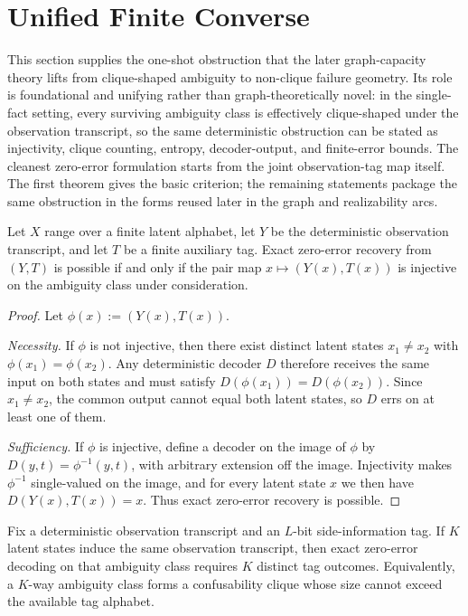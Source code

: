 \section{Unified Finite Converse}\label{sec:converse}


This section supplies the one-shot obstruction that the later graph-capacity theory lifts from clique-shaped ambiguity to non-clique failure geometry. Its role is foundational and unifying rather than graph-theoretically novel: in the single-fact setting, every surviving ambiguity class is effectively clique-shaped under the observation transcript, so the same deterministic obstruction can be stated as injectivity, clique counting, entropy, decoder-output, and finite-error bounds. The cleanest zero-error formulation starts from the joint observation-tag map itself. The first theorem gives the basic criterion; the remaining statements package the same obstruction in the forms reused later in the graph and realizability arcs.

\begin{theorem}\label{thm:pair-injective}
Let $X$ range over a finite latent alphabet, let $Y$ be the deterministic observation transcript, and let $T$ be a finite auxiliary tag. Exact zero-error recovery from $(Y,T)$ is possible if and only if the pair map $x \mapsto (Y(x),T(x))$ is injective on the ambiguity class under consideration.
\end{theorem}

\begin{proof}
Let $\phi(x):=(Y(x),T(x))$.

\emph{Necessity.} If $\phi$ is not injective, then there exist distinct latent states $x_1\neq x_2$ with $\phi(x_1)=\phi(x_2)$. Any deterministic decoder $D$ therefore receives the same input on both states and must satisfy $D(\phi(x_1))=D(\phi(x_2))$. Since $x_1\neq x_2$, the common output cannot equal both latent states, so $D$ errs on at least one of them.

\emph{Sufficiency.} If $\phi$ is injective, define a decoder on the image of $\phi$ by $D(y,t)=\phi^{-1}(y,t)$, with arbitrary extension off the image. Injectivity makes $\phi^{-1}$ single-valued on the image, and for every latent state $x$ we then have $D(Y(x),T(x))=x$. Thus exact zero-error recovery is possible.
\end{proof}

\begin{proposition}\label{thm:confusability-converse}
Fix a deterministic observation transcript and an $L$-bit side-information tag. If $K$ latent states induce the same observation transcript, then exact zero-error decoding on that ambiguity class requires $K$ distinct tag outcomes. Equivalently, a $K$-way ambiguity class forms a confusability clique whose size cannot exceed the available tag alphabet.
\end{proposition}

